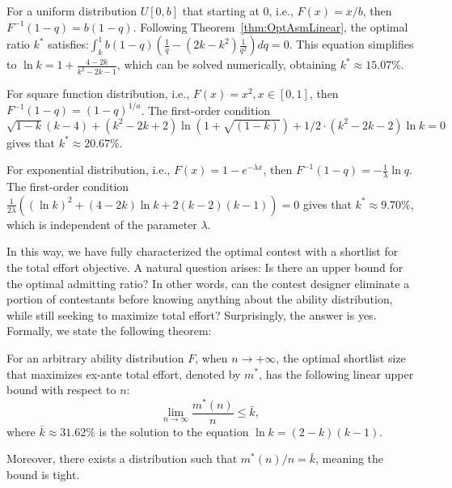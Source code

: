 \begin{example}\label{exam:OptimalUniform}
    For a uniform distribution $U[0,b]$ that starting at $0$, i.e., $F(x)=x/b$, then $F^{-1}(1-q)=b(1-q)$. Following Theorem~\ref{thm:OptAsmLinear}, the optimal ratio $k^*$ satisfies:\(\int_k^1 b(1-q)(\frac{1}{q}-(2k-k^2)\frac{1}{q^2})dq=0 \).
    This equation simplifies to $\ln k=1+\frac{4-2k}{k^2-2k-1}$, which can be solved numerically, obtaining $k^* \approx 15.07\%.$
\end{example}
\begin{example}\label{exam:OptimalSquare}
    For square function distribution, i.e., $F(x) = x^2, x\in[0,1]$, then $F^{-1}(1-q) = (1-q)^{1/a}$. The first-order condition $\sqrt{1-k}(k-4)+(k^2-2k+2)\ln(1+\sqrt{(1-k)})+1/2 \cdot(k^2-2k-2)\ln k =0$ gives that $k^*\approx 20.67\%$. 
\end{example}
\begin{example}\label{exam:OptimalExp}
    For exponential distribution, i.e., $F(x)=1-e^{-\lambda x}$, then $F^{-1}(1-q)=-\frac{1}{\lambda}\ln q$. The first-order condition $\frac{1}{2\lambda}((\ln k)^2+(4-2k)\ln k+2(k-2)(k-1))= 0$ gives that $k^*\approx 9.70\%$, which is independent of the parameter $\lambda$.
\end{example}


In this way, we have fully characterized the optimal contest with a shortlist for the total effort objective. A natural question arises: Is there an upper bound for the optimal admitting ratio? In other words, can the contest designer eliminate a portion of contestants before knowing anything about the ability distribution, while still seeking to maximize total effort? Surprisingly, the answer is yes. Formally, we state the following theorem:

\begin{theorem}\label{thm:UniversalBound}
    For an arbitrary ability distribution $F$, when $n\rightarrow +\infty$, the optimal shortlist size that maximizes ex-ante total effort, denoted by $m^{*}$, has the following linear upper bound with respect to $n$:
    $$ \lim_{n \rightarrow \infty} \frac{m^*(n)}{n} \leq \bar{k},$$
    where $\bar{k} \approx 31.62\%$ is the solution to the equation $\ln k=(2-k)(k-1)$.

    Moreover, there exists a distribution such that $m^*(n)/n=\bar{k}$, meaning the bound is tight. 
\end{theorem}

